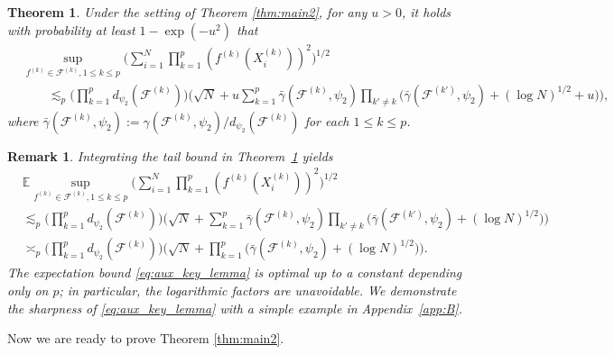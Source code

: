 \documentclass[numbers,webpdf,imaiai]{ima-authoring-template}
\theoremstyle{thmstyletwo}%
\newtheorem{theorem}{Theorem}%
\newtheorem{remark}{Remark}%
\numberwithin{equation}{section}
\numberwithin{equation}{section}
\newcommand{\F}{\mathcal{F}}
\newcommand{\E}{\mathbb{E}}
\begin{document}
\begin{theorem}\label{thm:key_lemma}
Under the setting of Theorem \ref{thm:main2}, for any $u>0$, it holds with probability at least $1-\exp(-u^2)$ that
\begin{align*}
&\sup_{f^{(k)}\in \F^{(k)},1\le k\le p} \bigg(\sum_{i=1}^{N}\prod_{k=1}^{p} \left(f^{(k)}(X_i^{(k)})\right)^2\bigg)^{1/2}\\
& \qquad \lesssim_p  \bigg(\prod_{k=1}^{p} d_{\psi_2}(\F^{(k)})\bigg)  \bigg(\sqrt{N}+u\sum_{k=1}^{p} \bar{\gamma}(\F^{(k)},\psi_2)\prod_{k'\ne k}\Big(\bar{\gamma}(\F^{(k')},\psi_2)+(\log N)^{1/2}+u\Big)\bigg),
\end{align*}
where $\bar{\gamma}(\F^{(k)},\psi_2):=\gamma(\F^{(k)},\psi_2)/d_{\psi_2}(\F^{(k)})$ for each $1\le k\le p$.
\end{theorem}

\begin{remark}\label{remark:optimality}
Integrating the tail bound in Theorem~\ref{thm:key_lemma} yields
\begin{align}\label{eq:aux_key_lemma}
    &\E \sup_{f^{(k)}\in \F^{(k)},1\le k\le p} \bigg(\sum_{i=1}^{N}\prod_{k=1}^{p} \left(f^{(k)}(X_i^{(k)})\right)^2\bigg)^{1/2} \nonumber\\
    &\lesssim_p \bigg(\prod_{k=1}^{p} d_{\psi_2}(\F^{(k)})\bigg)  \bigg(\sqrt{N}+\sum_{k=1}^{p} \bar{\gamma}(\F^{(k)},\psi_2)\prod_{k'\ne k}\Big(\bar{\gamma}(\F^{(k')},\psi_2)+(\log N)^{1/2}\Big)\bigg) \nonumber \\
    &\asymp_p \bigg(\prod_{k=1}^{p} d_{\psi_2}(\F^{(k)})\bigg)  \bigg(\sqrt{N}+\prod_{k=1}^{p} \Big(\bar{\gamma}(\F^{(k)},\psi_2)+(\log N)^{1/2}\Big)\bigg).
\end{align}
The expectation bound \eqref{eq:aux_key_lemma} is optimal up to a constant depending only on $p$; in particular, the logarithmic factors are unavoidable. We demonstrate the sharpness of \eqref{eq:aux_key_lemma} with a simple example in Appendix~\ref{app:B}.
\end{remark}

Now we are ready to prove Theorem \ref{thm:main2}.
\end{document}

